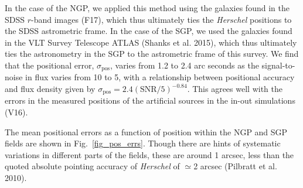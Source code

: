\documentclass[a4paper,fleqn,usenatbib, twocolumn]{aastex61}
\begin{document}
In the case of the NGP, we applied this method using the galaxies
found in the SDSS $r$-band images (F17), which thus ultimately ties the
{\it Herschel} positions to the SDSS astrometric frame.   In the case
of the SGP, we used the galaxies found in the VLT Survey Telescope
ATLAS (Shanks et al.  2015), which thus ultimately ties the
astronometry in the SGP to the astrometric frame of this survey.  We
find that the positional error, $\sigma_\mathrm{pos}$, varies from
1.2 to 2.4 arc seconds as the signal-to-noise in flux varies from 10 to 5,
with a relationship between positional accuracy and flux density given
by $\sigma_\mathrm{pos} = 2.4 (\mathrm{SNR}/5)^{-0.84}$.  This agrees
well with the errors in the measured positions of the artificial
sources in the in-out simulations (V16).


The mean positional errors as a function of position within the NGP
and SGP fields are shown in Fig.~\ref{fig_pos_errs}. Though there are
hints of systematic variations in different parts of the fields, these
are around 1 arcsec, less than the quoted absolute pointing accuracy of
{\it Herschel} of $\simeq$2 arcsec (Pilbratt et al. 2010).
\end{document}
